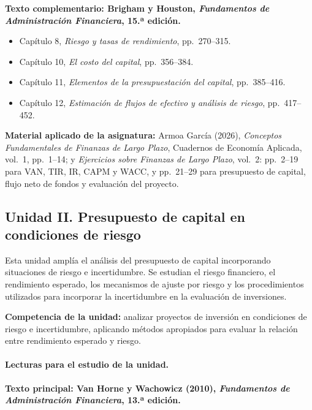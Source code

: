 \documentclass[12pt,a4paper]{article}
\begin{document}
\noindent
\textbf{Texto complementario: Brigham y Houston,
\textit{Fundamentos de Administración Financiera}, 15.ª edición.}

\begin{itemize}
    \item Capítulo 8, \textit{Riesgo y tasas de rendimiento},
    pp.~270--315.
    \item Capítulo 10, \textit{El costo del capital},
    pp.~356--384.
    \item Capítulo 11, \textit{Elementos de la presupuestación del capital},
    pp.~385--416.
    \item Capítulo 12, \textit{Estimación de flujos de efectivo y análisis
    de riesgo}, pp.~417--452.
\end{itemize}

\noindent
\textbf{Material aplicado de la asignatura:}
Armoa García (2026), \textit{Conceptos Fundamentales de Finanzas de Largo
Plazo}, Cuadernos de Economía Aplicada, vol.~1, pp.~1--14; y
\textit{Ejercicios sobre Finanzas de Largo Plazo}, vol.~2:
pp.~2--19 para VAN, TIR, IR, CAPM y WACC, y pp.~21--29 para presupuesto
de capital, flujo neto de fondos y evaluación del proyecto.
\parencite{armoa2026conceptos,armoa2026ejercicios}

\subsection{Unidad II. Presupuesto de capital en condiciones de riesgo}

Esta unidad amplía el análisis del presupuesto de capital incorporando
situaciones de riesgo e incertidumbre. Se estudian el riesgo financiero,
el rendimiento esperado, los mecanismos de ajuste por riesgo y los
procedimientos utilizados para incorporar la incertidumbre en la evaluación
de inversiones.
\parencite{uaProgramaFinanzasLargoPlazo}

\textbf{Competencia de la unidad:} analizar proyectos de inversión en
condiciones de riesgo e incertidumbre, aplicando métodos apropiados para
evaluar la relación entre rendimiento esperado y riesgo.

\paragraph{Lecturas para el estudio de la unidad.}

\textbf{Texto principal: Van Horne y Wachowicz (2010),
\textit{Fundamentos de Administración Financiera}, 13.ª edición.}
\end{document}
